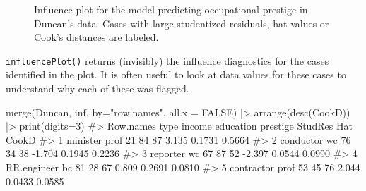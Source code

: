 \documentclass[
  letterpaper,
  10pt,
  krantz2]{krantz}
\makeatletter
\newenvironment{Shaded}{\begin{snugshade}}{\end{snugshade}}
\newcommand{\AttributeTok}[1]{\textcolor[rgb]{0.40,0.45,0.13}{#1}}
\newcommand{\CommentTok}[1]{\textcolor[rgb]{0.37,0.37,0.37}{#1}}
\newcommand{\ConstantTok}[1]{\textcolor[rgb]{0.56,0.35,0.01}{#1}}
\newcommand{\DecValTok}[1]{\textcolor[rgb]{0.68,0.00,0.00}{#1}}
\newcommand{\FunctionTok}[1]{\textcolor[rgb]{0.28,0.35,0.67}{#1}}
\newcommand{\NormalTok}[1]{\textcolor[rgb]{0.00,0.23,0.31}{#1}}
\newcommand{\SpecialCharTok}[1]{\textcolor[rgb]{0.37,0.37,0.37}{#1}}
\newcommand{\StringTok}[1]{\textcolor[rgb]{0.13,0.47,0.30}{#1}}
\newenvironment{kframe}{%
  \medskip{}
  \setlength{\fboxsep}{.8em}
  \def\at@end@of@kframe{}%
  \ifinner\ifhmode%
  \def\at@end@of@kframe{\end{minipage}}%
  \begin{minipage}{\columnwidth}%
  \fi\fi%
  \def\FrameCommand##1{\hskip\@totalleftmargin \hskip-\fboxsep
  \colorbox{shadecolor}{##1}\hskip-\fboxsep
      \hskip-\linewidth \hskip-\@totalleftmargin \hskip\columnwidth}%
  \MakeFramed {\advance\hsize-\width
    \@totalleftmargin\z@ \linewidth\hsize
    \@setminipage}}%
{\par\unskip\endMakeFramed%
  \at@end@of@kframe}
\renewenvironment{Shaded}{\begin{kframe}}{\end{kframe}}
\makeatother
\begin{document}
\begin{figure}[H]


\caption{\label{fig-duncan-infl}Influence plot for the model predicting
occupational prestige in Duncan's data. Cases with large studentized
residuals, hat-values or Cook's distances are labeled.}

\end{figure}%

\texttt{influencePlot()} returns (invisibly) the influence diagnostics
for the cases identified in the plot. It is often useful to look at data
values for these cases to understand why each of these was flagged.

\begin{Shaded}
\begin{Highlighting}[]
\FunctionTok{merge}\NormalTok{(Duncan, inf, }\AttributeTok{by=}\StringTok{"row.names"}\NormalTok{, }\AttributeTok{all.x =} \ConstantTok{FALSE}\NormalTok{) }\SpecialCharTok{|\textgreater{}} 
  \FunctionTok{arrange}\NormalTok{(}\FunctionTok{desc}\NormalTok{(CookD)) }\SpecialCharTok{|\textgreater{}} 
  \FunctionTok{print}\NormalTok{(}\AttributeTok{digits=}\DecValTok{3}\NormalTok{)}
\CommentTok{\#\textgreater{}     Row.names type income education prestige StudRes    Hat  CookD}
\CommentTok{\#\textgreater{} 1    minister prof     21        84       87   3.135 0.1731 0.5664}
\CommentTok{\#\textgreater{} 2   conductor   wc     76        34       38  {-}1.704 0.1945 0.2236}
\CommentTok{\#\textgreater{} 3    reporter   wc     67        87       52  {-}2.397 0.0544 0.0990}
\CommentTok{\#\textgreater{} 4 RR.engineer   bc     81        28       67   0.809 0.2691 0.0810}
\CommentTok{\#\textgreater{} 5  contractor prof     53        45       76   2.044 0.0433 0.0585}
\end{Highlighting}
\end{Shaded}
\end{document}
